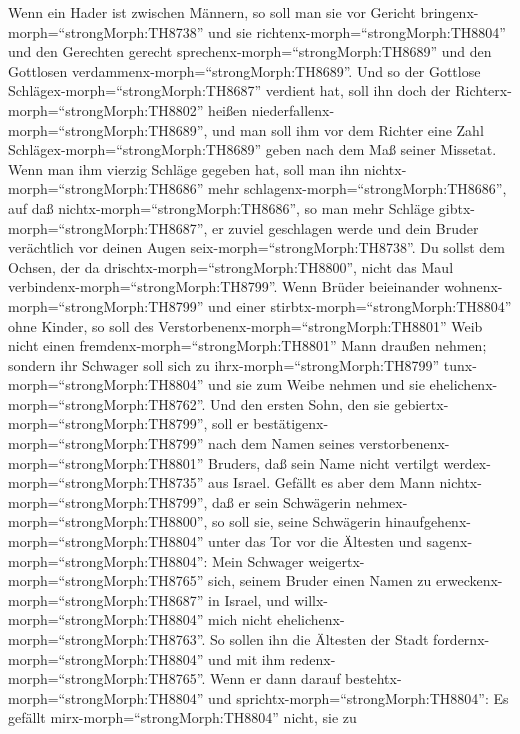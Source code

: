  Wenn ein Hader ist zwischen Männern, so soll man sie vor
Gericht bringenx-morph=``strongMorph:TH8738'' und sie
richtenx-morph=``strongMorph:TH8804'' und den Gerechten gerecht
sprechenx-morph=``strongMorph:TH8689'' und den Gottlosen
verdammenx-morph=``strongMorph:TH8689''.  Und so der
Gottlose Schlägex-morph=``strongMorph:TH8687'' verdient hat, soll ihn
doch der Richterx-morph=``strongMorph:TH8802'' heißen
niederfallenx-morph=``strongMorph:TH8689'', und man soll ihm vor dem
Richter eine Zahl Schlägex-morph=``strongMorph:TH8689'' geben nach dem
Maß seiner Missetat.  Wenn man ihm vierzig Schläge gegeben
hat, soll man ihn nichtx-morph=``strongMorph:TH8686'' mehr
schlagenx-morph=``strongMorph:TH8686'', auf daß
nichtx-morph=``strongMorph:TH8686'', so man mehr Schläge
gibtx-morph=``strongMorph:TH8687'', er zuviel geschlagen werde und dein
Bruder verächtlich vor deinen Augen seix-morph=``strongMorph:TH8738''.
 Du sollst dem Ochsen, der da
drischtx-morph=``strongMorph:TH8800'', nicht das Maul
verbindenx-morph=``strongMorph:TH8799''.  Wenn Brüder
beieinander wohnenx-morph=``strongMorph:TH8799'' und einer
stirbtx-morph=``strongMorph:TH8804'' ohne Kinder, so soll des
Verstorbenenx-morph=``strongMorph:TH8801'' Weib nicht einen
fremdenx-morph=``strongMorph:TH8801'' Mann draußen nehmen; sondern ihr
Schwager soll sich zu ihrx-morph=``strongMorph:TH8799''
tunx-morph=``strongMorph:TH8804'' und sie zum Weibe nehmen und sie
ehelichenx-morph=``strongMorph:TH8762''.  Und den ersten
Sohn, den sie gebiertx-morph=``strongMorph:TH8799'', soll er
bestätigenx-morph=``strongMorph:TH8799'' nach dem Namen seines
verstorbenenx-morph=``strongMorph:TH8801'' Bruders, daß sein Name nicht
vertilgt werdex-morph=``strongMorph:TH8735'' aus Israel. 
Gefällt es aber dem Mann nichtx-morph=``strongMorph:TH8799'', daß er
sein Schwägerin nehmex-morph=``strongMorph:TH8800'', so soll sie, seine
Schwägerin hinaufgehenx-morph=``strongMorph:TH8804'' unter das Tor vor
die Ältesten und sagenx-morph=``strongMorph:TH8804'': Mein Schwager
weigertx-morph=``strongMorph:TH8765'' sich, seinem Bruder einen Namen zu
erweckenx-morph=``strongMorph:TH8687'' in Israel, und
willx-morph=``strongMorph:TH8804'' mich nicht
ehelichenx-morph=``strongMorph:TH8763''.  So sollen ihn die
Ältesten der Stadt fordernx-morph=``strongMorph:TH8804'' und mit ihm
redenx-morph=``strongMorph:TH8765''. Wenn er dann darauf
bestehtx-morph=``strongMorph:TH8804'' und
sprichtx-morph=``strongMorph:TH8804'': Es gefällt
mirx-morph=``strongMorph:TH8804'' nicht, sie zu
